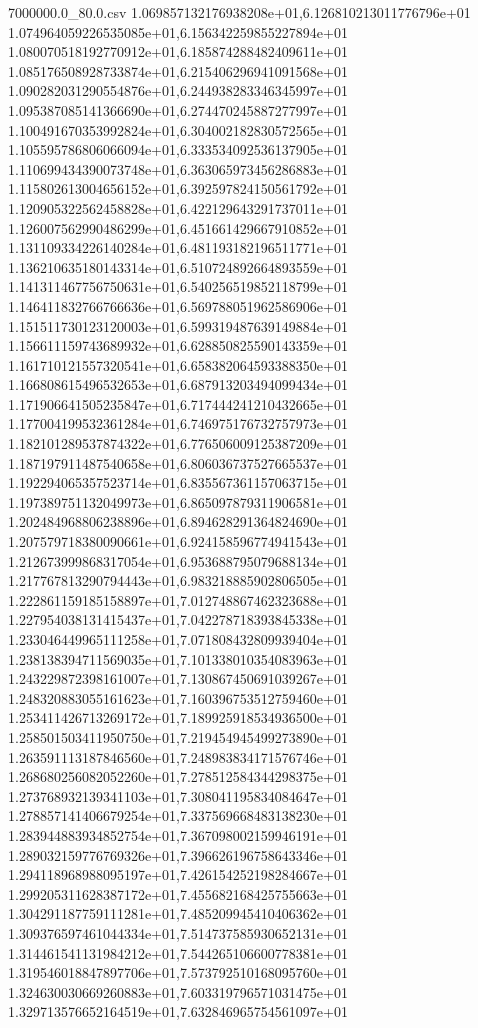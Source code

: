 \begin{filecontents*}{7000000.0_80.0.csv}
1.069857132176938208e+01,6.126810213011776796e+01
1.074964059226535085e+01,6.156342259855227894e+01
1.080070518192770912e+01,6.185874288482409611e+01
1.085176508928733874e+01,6.215406296941091568e+01
1.090282031290554876e+01,6.244938283346345997e+01
1.095387085141366690e+01,6.274470245887277997e+01
1.100491670353992824e+01,6.304002182830572565e+01
1.105595786806066094e+01,6.333534092536137905e+01
1.110699434390073748e+01,6.363065973456286883e+01
1.115802613004656152e+01,6.392597824150561792e+01
1.120905322562458828e+01,6.422129643291737011e+01
1.126007562990486299e+01,6.451661429667910852e+01
1.131109334226140284e+01,6.481193182196511771e+01
1.136210635180143314e+01,6.510724892664893559e+01
1.141311467756750631e+01,6.540256519852118799e+01
1.146411832766766636e+01,6.569788051962586906e+01
1.151511730123120003e+01,6.599319487639149884e+01
1.156611159743689932e+01,6.628850825590143359e+01
1.161710121557320541e+01,6.658382064593388350e+01
1.166808615496532653e+01,6.687913203494099434e+01
1.171906641505235847e+01,6.717444241210432665e+01
1.177004199532361284e+01,6.746975176732757973e+01
1.182101289537874322e+01,6.776506009125387209e+01
1.187197911487540658e+01,6.806036737527665537e+01
1.192294065357523714e+01,6.835567361157063715e+01
1.197389751132049973e+01,6.865097879311906581e+01
1.202484968806238896e+01,6.894628291364824690e+01
1.207579718380090661e+01,6.924158596774941543e+01
1.212673999868317054e+01,6.953688795079688134e+01
1.217767813290794443e+01,6.983218885902806505e+01
1.222861159185158897e+01,7.012748867462323688e+01
1.227954038131415437e+01,7.042278718393845338e+01
1.233046449965111258e+01,7.071808432809939404e+01
1.238138394711569035e+01,7.101338010354083963e+01
1.243229872398161007e+01,7.130867450691039267e+01
1.248320883055161623e+01,7.160396753512759460e+01
1.253411426713269172e+01,7.189925918534936500e+01
1.258501503411950750e+01,7.219454945499273890e+01
1.263591113187846560e+01,7.248983834171576746e+01
1.268680256082052260e+01,7.278512584344298375e+01
1.273768932139341103e+01,7.308041195834084647e+01
1.278857141406679254e+01,7.337569668483138230e+01
1.283944883934852754e+01,7.367098002159946191e+01
1.289032159776769326e+01,7.396626196758643346e+01
1.294118968988095197e+01,7.426154252198284667e+01
1.299205311628387172e+01,7.455682168425755663e+01
1.304291187759111281e+01,7.485209945410406362e+01
1.309376597461044334e+01,7.514737585930652131e+01
1.314461541131984212e+01,7.544265106600778381e+01
1.319546018847897706e+01,7.573792510168095760e+01
1.324630030669260883e+01,7.603319796571031475e+01
1.329713576652164519e+01,7.632846965754561097e+01

\end{filecontents*}
